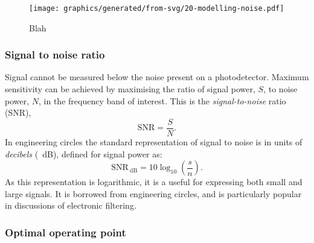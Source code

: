 \begin{figure}
  \centering
  \texttt{[image: graphics/generated/from-svg/20-modelling-noise.pdf]}
  \caption[Modelling noise]{\label{fig:modelling-noise}Blah}
\end{figure}

\subsubsection{\label{sec:snr}Signal to noise ratio}
Signal cannot be measured below the noise present on a photodetector. Maximum sensitivity can be achieved by maximising the ratio of signal power, $S$, to noise power, $N$, in the frequency band of interest. This is the \emph{signal-to-noise} ratio (SNR),
\begin{equation}
  \text{SNR} = \frac{S}{N}.
\end{equation}
In engineering circles the standard representation of signal to noise is in units of \emph{decibels} (\SI{}{\deci\bel}), defined for signal power as:
\begin{equation}
  \text{SNR}_{\SI{}{\deci\bel}} = 10 \log_{10} \left( \frac{s}{n} \right).
\end{equation}
As this representation is logarithmic, it is a useful for expressing both small and large signals. It is borrowed from engineering circles, and is particularly popular in discussions of electronic filtering.

\subsubsection{Optimal operating point}

